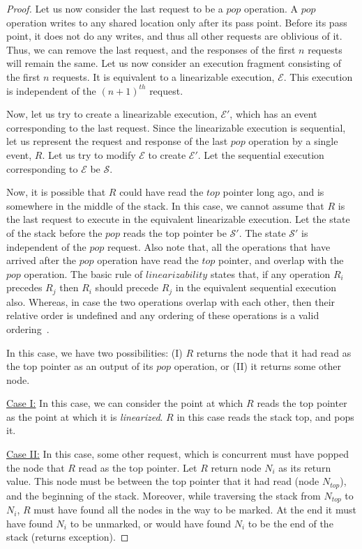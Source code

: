 \documentclass{llncs}
\begin{document}
\begin{proof}
Let us now consider the last request to be a $pop$ operation. A $pop$ operation writes
to any shared location only after its pass point. Before its pass point, it does not do
any writes, and thus all other requests are oblivious of it. 
Thus, we can remove the last request, and the responses of the first $n$ requests will remain the same.
Let us now consider an execution fragment consisting of the first $n$ requests. It is equivalent to
a linearizable execution, $\mathcal{E}$. This execution is independent of the $(n+1)^{th}$ request. 

Now, let us try to create a linearizable execution, $\mathcal{E'}$, which has an event corresponding
to the last request. Since the linearizable execution is sequential, let us represent the request
and response of the last $pop$ operation by a single event, $R$. 
Let us try to modify $\mathcal{E}$ to create $\mathcal{E'}$. Let the sequential execution corresponding
to $\mathcal{E}$ be $\mathcal{S}$.

Now, it is possible that $R$ could have read the $top$ pointer long ago, and
is somewhere in the middle of the stack. In this case, we cannot assume that $R$ is the last
request to execute in the equivalent linearizable execution. Let the state of the stack before the 
$pop$ reads the top pointer be $\mathcal{S'}$. The state $\mathcal{S'}$ is independent of the $pop$ request.
Also note that, all the operations that have arrived after the $pop$ operation have read the $top$ pointer, and 
overlap with the $pop$ operation. The basic rule of $linearizability$ states that, if any operation $R_i$ 
precedes $R_j$ then $R_i$ should precede $R_j$ in the equivalent sequential execution also. Whereas, in case 
the two operations overlap with each other, then their relative order is undefined and any ordering of these 
operations is a valid ordering~\cite{artOfMulti}. 

In this case, we have two possibilities: (I) $R$ returns the node that it had read as the top pointer as an output
of its $pop$ operation, or (II) it returns some other node. 

\noindent \underline{Case I:} In this case, we can consider the point at which $R$ reads the top pointer as the point
at which it is {\em linearized}. $R$ in this case reads the stack top, and pops it.

\noindent \underline{Case II:} In this case, some other request, which is concurrent must have popped the node that
$R$ read as the top pointer. Let $R$ return node $N_i$ as its return value. This node must be between the top pointer
that it had read (node $N_{top}$), and the beginning of the stack. Moreover, while traversing the stack from $N_{top}$
to $N_i$, $R$ must have found all the nodes in the way to be marked. At the end it must have found $N_i$ to be unmarked,
or would have found $N_i$ to be the end of the stack (returns exception).


\end{proof}
\end{document}
